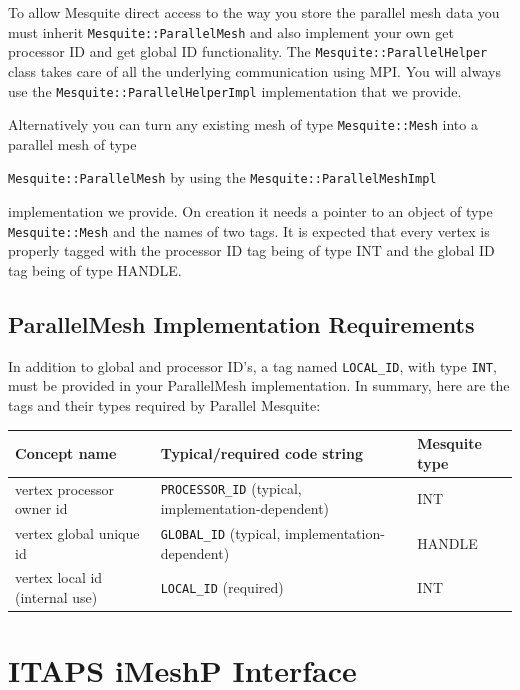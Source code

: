 To allow Mesquite direct access to the way you store the parallel mesh data you must inherit \texttt{Mesquite::ParallelMesh} and also implement your own get processor ID and get global ID functionality. The \texttt{Mesquite::ParallelHelper} class takes care of all the underlying communication using MPI. You will always use the \texttt{Mesquite::ParallelHelperImpl} implementation that we provide.

Alternatively you can turn any existing mesh of type \texttt{Mesquite::Mesh} into a parallel mesh of type\vspace{-5pt} \begin{center}
\texttt{Mesquite::ParallelMesh} by using the \texttt{Mesquite::ParallelMeshImpl} 
\end{center} \vspace{-5 pt}implementation we provide. On creation it needs a pointer to an object of type \texttt{Mesquite::Mesh} and the names of two tags. It is expected that every vertex is properly tagged with the processor ID tag being of type INT and the global ID tag being of type HANDLE.


\subsection{ParallelMesh Implementation Requirements}

In addition to global and processor ID's, a tag named \texttt{LOCAL\_ID}, with type \texttt{INT}, must be provided in
your ParallelMesh implementation.  In summary, here are the tags and
their types required by Parallel Mesquite:

\begin{tabular}{ | l | l | l | }
  \hline                        
  Concept name & Typical/required code string &  Mesquite type \\
\hline
 vertex processor owner id & \texttt{PROCESSOR\_ID} (typical, implementation-dependent) & INT \\
 vertex global unique id & \texttt{GLOBAL\_ID} (typical,  implementation-dependent) & HANDLE \\
 vertex local id (internal use) & \texttt{LOCAL\_ID} (required) & INT \\
  \hline  
\end{tabular}

\section{ITAPS iMeshP Interface}

